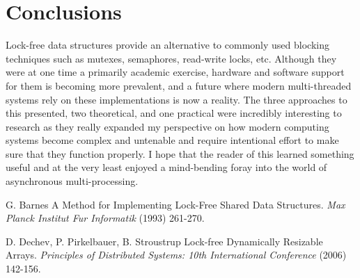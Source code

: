 \documentclass{article}
\begin{document}
\section*{Conclusions}
Lock-free data structures provide an alternative to commonly used blocking techniques such as mutexes, semaphores, read-write locks, etc. Although they were at one time a primarily academic exercise, hardware and software support for them is becoming more prevalent, and a future where modern multi-threaded systems rely on these implementations is now a reality. The three approaches to this presented, two theoretical, and one practical were incredibly interesting to research as they really expanded my perspective on how modern computing systems become complex and untenable and require intentional effort to make sure that they function properly. I hope that the reader of this learned something useful and at the very least enjoyed a mind-bending foray into the world of asynchronous multi-processing.

\begin{thebibliography}{9}

G. Barnes %
\newblock A Method for Implementing Lock-Free Shared Data Structures. %
\newblock \emph{Max Planck Institut Fur Informatik} (1993) 261-270. 

D. Dechev, P. Pirkelbauer, B. Stroustrup %
\newblock Lock-free Dynamically Resizable Arrays. %
\newblock \emph{Principles of Distributed Systems: 10th International Conference} (2006) 142-156. %

\end{thebibliography}
\end{document}
